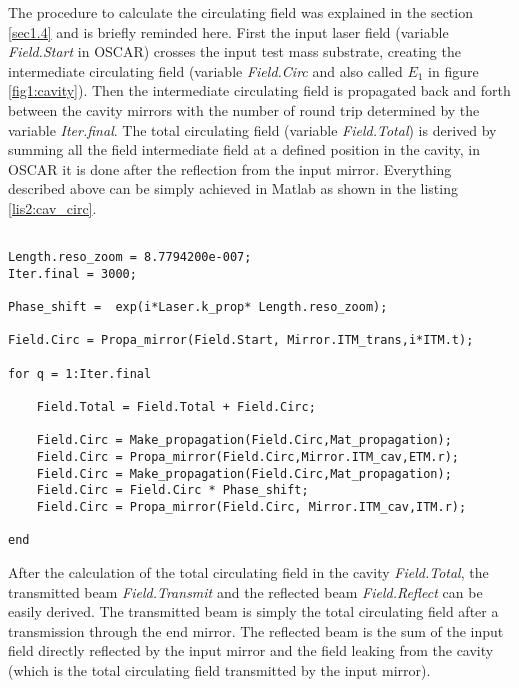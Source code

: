 The procedure to calculate the circulating field was explained in the section \ref{sec1.4} and is briefly reminded here. First the input laser field (variable \emph{Field.Start} in OSCAR) crosses the input test mass substrate, creating the intermediate circulating field (variable \emph{Field.Circ} and also called $E_1$ in figure \ref{fig1:cavity}). Then the intermediate circulating field is propagated back and forth between the cavity mirrors with the number of round trip determined by the variable \emph{Iter.final}. The total circulating field (variable \emph{Field.Total}) is derived by summing all the field intermediate field at a defined position in the cavity, in OSCAR it is done after the reflection from the input mirror. Everything described above can be simply achieved in Matlab as shown in the listing \ref{lis2:cav_circ}.\\

\begin{lstlisting}[float=htp,caption=The core of the OSCAR programm to calculate the circulating field in a cavity\label{lis2:cav_circ},frame=lines]

Length.reso_zoom = 8.7794200e-007;
Iter.final = 3000;

Phase_shift =  exp(i*Laser.k_prop* Length.reso_zoom);

Field.Circ = Propa_mirror(Field.Start, Mirror.ITM_trans,i*ITM.t);

for q = 1:Iter.final

    Field.Total = Field.Total + Field.Circ;

    Field.Circ = Make_propagation(Field.Circ,Mat_propagation);
    Field.Circ = Propa_mirror(Field.Circ,Mirror.ITM_cav,ETM.r);
    Field.Circ = Make_propagation(Field.Circ,Mat_propagation);
    Field.Circ = Field.Circ * Phase_shift;
    Field.Circ = Propa_mirror(Field.Circ, Mirror.ITM_cav,ITM.r);

end

\end{lstlisting}

After the calculation of the total circulating field in the cavity \emph{Field.Total}, the transmitted beam \emph{Field.Transmit} and the reflected beam \emph{Field.Reflect} can be easily derived. The transmitted beam is simply the total circulating field after a transmission through the end mirror. The reflected beam is the sum of the input field directly reflected by the input mirror and the field leaking from the cavity (which is the total circulating field transmitted by the input mirror).\\

